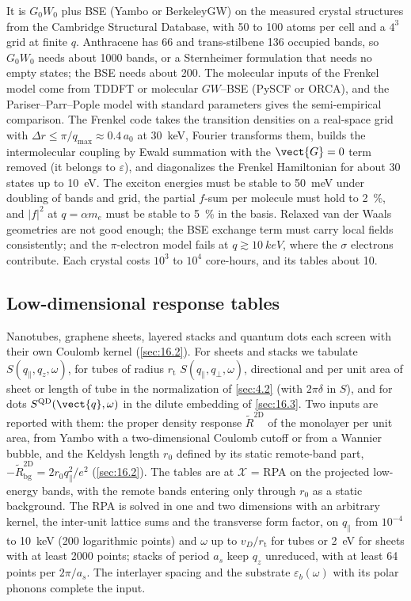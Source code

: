 It is $G_0W_0$ plus BSE (Yambo or BerkeleyGW) on the measured crystal structures from the Cambridge Structural Database, with 50 to 100 atoms per cell and a $4^3$ grid at finite $q$. Anthracene has 66 and trans-stilbene 136 occupied bands, so $G_0W_0$ needs about 1000 bands, or a Sternheimer formulation that needs no empty states; the BSE needs about 200. The molecular inputs of the Frenkel model come from TDDFT or molecular $GW$--BSE (PySCF or ORCA), and the Pariser--Parr--Pople model with standard parameters gives the semi-empirical comparison. The Frenkel code takes the transition densities on a real-space grid with $\Delta r \le \pi/q_{\mathrm{max}} \approx 0.4\,a_0$ at \SI{30}{keV}, Fourier transforms them, builds the intermolecular coupling by Ewald summation with the $\vect{G} = 0$ term removed (it belongs to $\varepsilon$), and diagonalizes the Frenkel Hamiltonian for about 30 states up to \SI{10}{eV}. The exciton energies must be stable to \SI{50}{meV} under doubling of bands and grid, the partial $f$-sum per molecule must hold to \SI{2}{\percent}, and $|f|^2$ at $q = \alpha m_e$ must be stable to \SI{5}{\percent} in the basis. Relaxed van der Waals geometries are not good enough; the BSE exchange term must carry local fields consistently; and the $\pi$-electron model fails at $q \gtrsim \SI{10}{keV}$, where the $\sigma$ electrons contribute. Each crystal costs $10^3$ to $10^4$ core-hours, and its tables about 10.

\subsection{Low-dimensional response tables}

Nanotubes, graphene sheets, layered stacks and quantum dots each screen with their own Coulomb kernel (\cref{sec:16.2}). For sheets and stacks we tabulate $S(q_\parallel,q_z,\omega)$, for tubes of radius $r_{\mathrm{t}}$ $S(q_\parallel,q_\perp,\omega)$, directional and per unit area of sheet or length of tube in the normalization of \cref{sec:4.2} (with $2\pi\delta$ in $S$), and for dots $S^{\mathrm{QD}}(\vect{q},\omega)$ in the dilute embedding of \cref{sec:16.3}. Two inputs are reported with them: the proper density response $\tilde R^{\mathrm{2D}}$ of the monolayer per unit area, from Yambo with a two-dimensional Coulomb cutoff or from a Wannier bubble, and the Keldysh length $r_0$ defined by its static remote-band part, $-\tilde R^{\mathrm{2D}}_{\mathrm{bg}} = 2r_0q_\parallel^2/e^2$ (\cref{sec:16.2}). The tables are at $\mathcal{X}$ = RPA on the projected low-energy bands, with the remote bands entering only through $r_0$ as a static background. The RPA is solved in one and two dimensions with an arbitrary kernel, the inter-unit lattice sums and the transverse form factor, on $q_\parallel$ from $10^{-4}$ to \SI{10}{keV} (200 logarithmic points) and $\omega$ up to $v_D/r_{\mathrm{t}}$ for tubes or \SI{2}{eV} for sheets with at least 2000 points; stacks of period $a_s$ keep $q_z$ unreduced, with at least 64 points per $2\pi/a_s$. The interlayer spacing and the substrate $\varepsilon_b(\omega)$ with its polar phonons complete the input.

